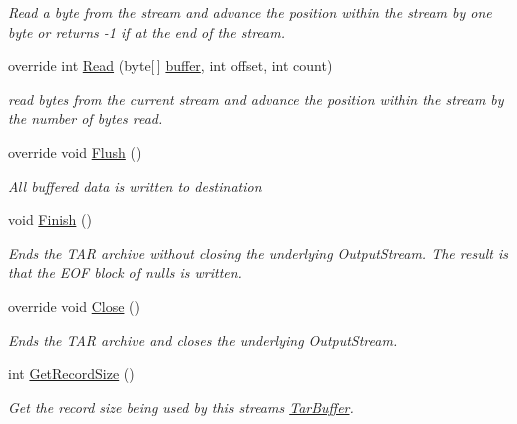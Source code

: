 \begin{DoxyCompactItemize}
\begin{DoxyCompactList}\small\item\em Read a byte from the stream and advance the position within the stream by one byte or returns -\/1 if at the end of the stream. \end{DoxyCompactList}\item 
override int \hyperlink{class_i_c_sharp_code_1_1_sharp_zip_lib_1_1_tar_1_1_tar_output_stream_a81ff99bd6bbb5900972616c0df73b62d}{Read} (byte\mbox{[}$\,$\mbox{]} \hyperlink{class_i_c_sharp_code_1_1_sharp_zip_lib_1_1_tar_1_1_tar_output_stream_a5c3ade1fecb25c00a1e17af46cac1e0b}{buffer}, int offset, int count)
\begin{DoxyCompactList}\small\item\em read bytes from the current stream and advance the position within the stream by the number of bytes read. \end{DoxyCompactList}\item 
override void \hyperlink{class_i_c_sharp_code_1_1_sharp_zip_lib_1_1_tar_1_1_tar_output_stream_a477e87e93e590aecbf41527d8e1e8222}{Flush} ()
\begin{DoxyCompactList}\small\item\em All buffered data is written to destination \end{DoxyCompactList}\item 
void \hyperlink{class_i_c_sharp_code_1_1_sharp_zip_lib_1_1_tar_1_1_tar_output_stream_a35766aed4ddf363bbaca72d33b0e071d}{Finish} ()
\begin{DoxyCompactList}\small\item\em Ends the T\+AR archive without closing the underlying Output\+Stream. The result is that the E\+OF block of nulls is written. \end{DoxyCompactList}\item 
override void \hyperlink{class_i_c_sharp_code_1_1_sharp_zip_lib_1_1_tar_1_1_tar_output_stream_ab744534cafac308f51f6586f06ca3d86}{Close} ()
\begin{DoxyCompactList}\small\item\em Ends the T\+AR archive and closes the underlying Output\+Stream. \end{DoxyCompactList}\item 
int \hyperlink{class_i_c_sharp_code_1_1_sharp_zip_lib_1_1_tar_1_1_tar_output_stream_a3883f68913041868a45f1f257f490b8f}{Get\+Record\+Size} ()
\begin{DoxyCompactList}\small\item\em Get the record size being used by this stream\textquotesingle{}s \hyperlink{class_i_c_sharp_code_1_1_sharp_zip_lib_1_1_tar_1_1_tar_buffer}{Tar\+Buffer}. \end{DoxyCompactList}\item 

\end{DoxyCompactItemize}
